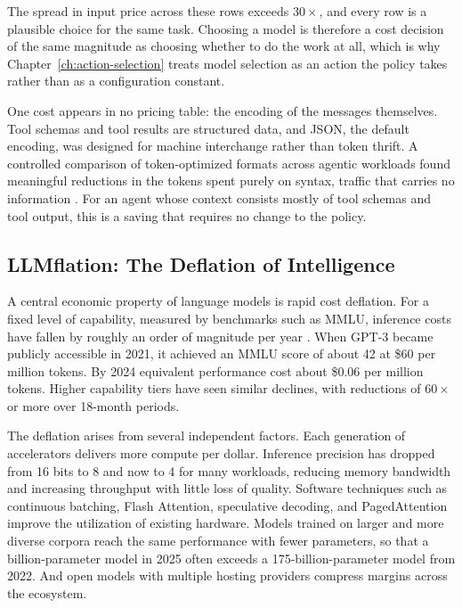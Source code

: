 \documentclass[11pt]{book}
\begin{document}
The spread in input price across these rows exceeds $30\times$, and every row is a plausible choice for the same task. Choosing a model is therefore a cost decision of the same magnitude as choosing whether to do the work at all, which is why Chapter~\ref{ch:action-selection} treats model selection as an action the policy takes rather than as a configuration constant.

One cost appears in no pricing table: the encoding of the messages themselves. Tool schemas and tool results are structured data, and JSON, the default encoding, was designed for machine interchange rather than token thrift. A controlled comparison of token-optimized formats across agentic workloads found meaningful reductions in the tokens spent purely on syntax, traffic that carries no information \cite{notation2026}. For an agent whose context consists mostly of tool schemas and tool output, this is a saving that requires no change to the policy.

\subsection{LLMflation: The Deflation of Intelligence}

A central economic property of language models is rapid cost deflation. For a fixed level of capability, measured by benchmarks such as MMLU, inference costs have fallen by roughly an order of magnitude per year \cite{llmflation2024, epochpricing2025}. When GPT-3 became publicly accessible in 2021, it achieved an MMLU score of about 42 at \$60 per million tokens. By 2024 equivalent performance cost about \$0.06 per million tokens. Higher capability tiers have seen similar declines, with reductions of $60\times$ or more over 18-month periods.

The deflation arises from several independent factors. Each generation of accelerators delivers more compute per dollar. Inference precision has dropped from 16 bits to 8 and now to 4 for many workloads, reducing memory bandwidth and increasing throughput with little loss of quality. Software techniques such as continuous batching, Flash Attention, speculative decoding, and PagedAttention improve the utilization of existing hardware. Models trained on larger and more diverse corpora reach the same performance with fewer parameters, so that a billion-parameter model in 2025 often exceeds a 175-billion-parameter model from 2022. And open models with multiple hosting providers compress margins across the ecosystem.
\end{document}
